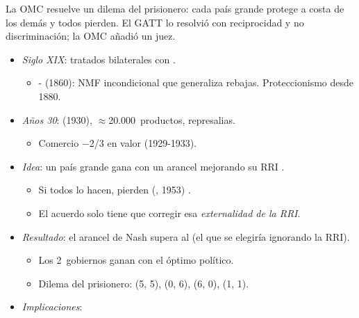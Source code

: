 \documentclass{article}
\begin{document}
\begin{columnas}
\begin{ideaclave}
La OMC resuelve un dilema del prisionero: cada país grande protege a costa de los demás y todos pierden. El GATT lo resolvió con reciprocidad y no discriminación; la OMC añadió un juez.
\end{ideaclave}

\begin{itemize}
\item \emph{Siglo XIX}: tratados bilaterales con .
  \begin{itemize}
  \item {}- (1860): NMF incondicional que generaliza rebajas. Proteccionismo desde 1880.
  \end{itemize}
\item \emph{Años 30}:  (1930), $\approx$20.000~productos, represalias.
  \begin{itemize}
  \item Comercio $-$2/3 en valor (1929-1933).
  \end{itemize}
\end{itemize}
\begin{itemize}
\item \emph{Idea}: un país grande gana con un arancel mejorando su RRI .
  \begin{itemize}
  \item Si todos lo hacen, pierden (, 1953) .
  \item El acuerdo solo tiene que corregir esa \emph{externalidad de la RRI}.
  \end{itemize}
\item \emph{Resultado}: el arancel de Nash supera al  (el que se elegiría ignorando la RRI).
  \begin{itemize}
  \item Los 2~gobiernos ganan con el óptimo político.
  \item Dilema del prisionero: (5, 5), (0, 6), (6, 0), \colorbox{tceesalvia}{(1, 1)}.
  \end{itemize}
\item \emph{Implicaciones}:

\end{itemize}
\end{columnas}
\end{document}
